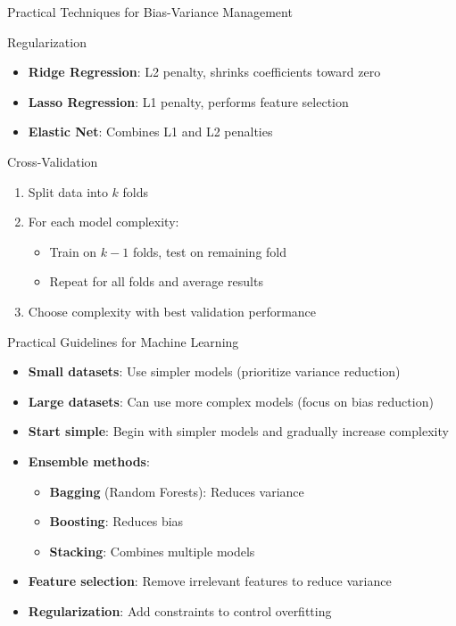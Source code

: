 \documentclass{beamer}
\begin{document}
\begin{frame}{Practical Techniques for Bias-Variance Management}
  \begin{block}{Regularization}
    \begin{itemize}
      \item \textbf{Ridge Regression}: L2 penalty, shrinks coefficients toward zero
      \item \textbf{Lasso Regression}: L1 penalty, performs feature selection
      \item \textbf{Elastic Net}: Combines L1 and L2 penalties
    \end{itemize}
  \end{block}
  
  \begin{block}{Cross-Validation}
    \begin{enumerate}
      \item Split data into $k$ folds
      \item For each model complexity:
      \begin{itemize}
        \item Train on $k-1$ folds, test on remaining fold
        \item Repeat for all folds and average results
      \end{itemize}
      \item Choose complexity with best validation performance
    \end{enumerate}
  \end{block}
\end{frame}

\begin{frame}{Practical Guidelines for Machine Learning}
  \begin{itemize}
    \item \textbf{Small datasets}: Use simpler models (prioritize variance reduction)
    \item \textbf{Large datasets}: Can use more complex models (focus on bias reduction)
    \item \textbf{Start simple}: Begin with simpler models and gradually increase complexity
    \item \textbf{Ensemble methods}:
    \begin{itemize}
      \item \textbf{Bagging} (Random Forests): Reduces variance
      \item \textbf{Boosting}: Reduces bias
      \item \textbf{Stacking}: Combines multiple models
    \end{itemize}
    \item \textbf{Feature selection}: Remove irrelevant features to reduce variance
    \item \textbf{Regularization}: Add constraints to control overfitting
  \end{itemize}
\end{frame}
\end{document}

